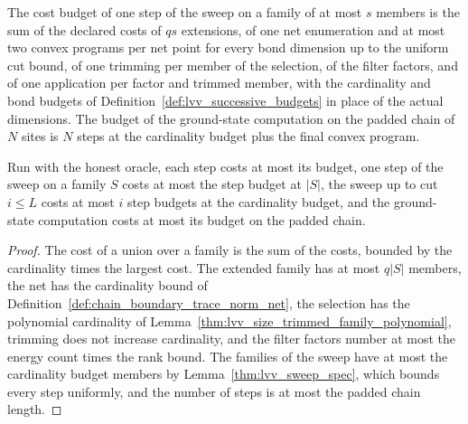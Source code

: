 \begin{definition}
    \label{def:lvv_cost_budgets}
    \leanok
    The cost budget of one step of the sweep on a family of at most $s$
    members is the sum of the declared costs of $qs$ extensions, of one net
    enumeration and at most two convex programs per net point for every bond
    dimension up to the uniform cut bound, of one trimming per member of the
    selection, of the filter factors, and of one application per factor and
    trimmed member, with the cardinality and bond budgets of
    Definition~\ref{def:lvv_successive_budgets} in place of the actual
    dimensions. The budget of the ground-state computation on the padded chain
    of $N$ sites is $N$ steps at the cardinality budget plus the final convex
    program.
\end{definition}

\begin{lemma}
    \label{thm:lvv_program_cost}
    \leanok
    Run with the honest oracle, each step costs at most its budget, one step of
    the sweep on a family $S$ costs at most the step budget at $|S|$, the sweep
    up to cut $i\le L$ costs at most $i$ step budgets at the cardinality budget,
    and the ground-state computation costs at most its budget on the padded
    chain.
\end{lemma}
\begin{proof}
    \leanok
    The cost of a union over a family is the sum of the costs, bounded by the
    cardinality times the largest cost. The extended family has at most $q|S|$
    members, the net has the cardinality bound of
    Definition~\ref{def:chain_boundary_trace_norm_net}, the selection has the polynomial
    cardinality of Lemma~\ref{thm:lvv_size_trimmed_family_polynomial}, trimming
    does not increase cardinality, and the filter factors number at most the
    energy count times the rank bound. The families of the sweep have at most
    the cardinality budget members by Lemma~\ref{thm:lvv_sweep_spec}, which
    bounds every step uniformly, and the number of steps is at most the padded
    chain length.
\end{proof}

